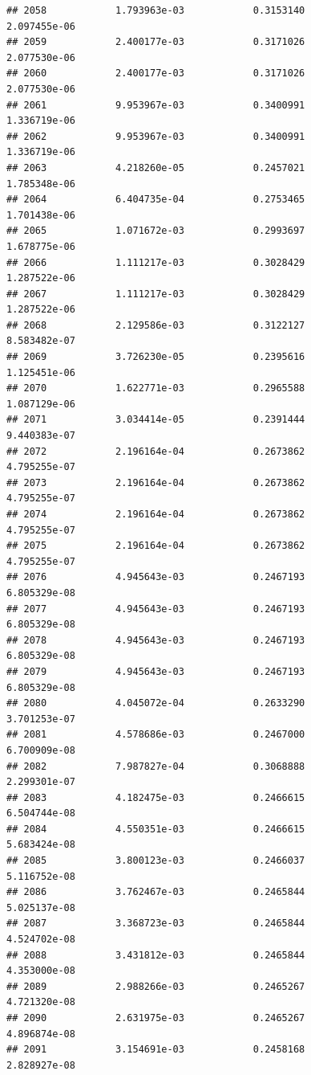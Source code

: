 \documentclass[
]{article}
\begin{document}
\begin{verbatim}
## 2058            1.793963e-03            0.3153140            2.097455e-06
## 2059            2.400177e-03            0.3171026            2.077530e-06
## 2060            2.400177e-03            0.3171026            2.077530e-06
## 2061            9.953967e-03            0.3400991            1.336719e-06
## 2062            9.953967e-03            0.3400991            1.336719e-06
## 2063            4.218260e-05            0.2457021            1.785348e-06
## 2064            6.404735e-04            0.2753465            1.701438e-06
## 2065            1.071672e-03            0.2993697            1.678775e-06
## 2066            1.111217e-03            0.3028429            1.287522e-06
## 2067            1.111217e-03            0.3028429            1.287522e-06
## 2068            2.129586e-03            0.3122127            8.583482e-07
## 2069            3.726230e-05            0.2395616            1.125451e-06
## 2070            1.622771e-03            0.2965588            1.087129e-06
## 2071            3.034414e-05            0.2391444            9.440383e-07
## 2072            2.196164e-04            0.2673862            4.795255e-07
## 2073            2.196164e-04            0.2673862            4.795255e-07
## 2074            2.196164e-04            0.2673862            4.795255e-07
## 2075            2.196164e-04            0.2673862            4.795255e-07
## 2076            4.945643e-03            0.2467193            6.805329e-08
## 2077            4.945643e-03            0.2467193            6.805329e-08
## 2078            4.945643e-03            0.2467193            6.805329e-08
## 2079            4.945643e-03            0.2467193            6.805329e-08
## 2080            4.045072e-04            0.2633290            3.701253e-07
## 2081            4.578686e-03            0.2467000            6.700909e-08
## 2082            7.987827e-04            0.3068888            2.299301e-07
## 2083            4.182475e-03            0.2466615            6.504744e-08
## 2084            4.550351e-03            0.2466615            5.683424e-08
## 2085            3.800123e-03            0.2466037            5.116752e-08
## 2086            3.762467e-03            0.2465844            5.025137e-08
## 2087            3.368723e-03            0.2465844            4.524702e-08
## 2088            3.431812e-03            0.2465844            4.353000e-08
## 2089            2.988266e-03            0.2465267            4.721320e-08
## 2090            2.631975e-03            0.2465267            4.896874e-08
## 2091            3.154691e-03            0.2458168            2.828927e-08

\end{verbatim}
\end{document}
